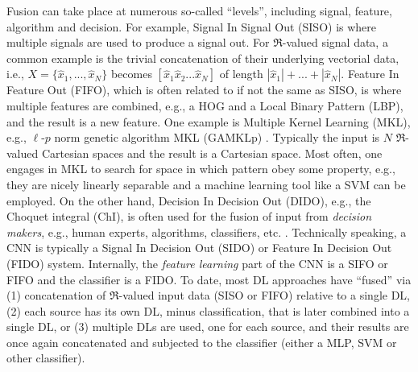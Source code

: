 \documentclass[12pt]{spieman}
\begin{document}
\begin{spacing}{1}
Fusion can take place at numerous so-called ``levels'', including signal, feature, algorithm and decision. For example, Signal In Signal Out (SISO) is where multiple signals are used to produce a signal out. For $\Re$-valued signal data, a common example is the trivial concatenation of their underlying vectorial data, i.e., $X=\{ \hat{x}_1, ... , \hat{x}_N \}$ becomes $[ \hat{x}_1 \hat{x}_2 ... \hat{x}_N ]$ of length $|\hat{x}_1|+...+|\hat{x}_N|$. Feature In Feature Out (FIFO), which is often related to if not the same as SISO, is where multiple features are combined, e.g., a HOG and a Local Binary Pattern (LBP), and the result is a new feature. One example is Multiple Kernel Learning (MKL), e.g., $\ell$-$p$ norm genetic algorithm MKL (GAMKLp) \cite{7762088} . Typically the input is $N$ $\Re$-valued Cartesian spaces and the result is a Cartesian space. Most often, one engages in MKL to search for space in which pattern obey some property, e.g., they are nicely linearly separable and a machine learning tool like a SVM can be employed. On the other hand, Decision In Decision Out (DIDO), e.g., the Choquet integral (ChI), is often used for the fusion of input from \emph{decision makers}, e.g., human experts, algorithms, classifiers, etc. \cite{6722924}. Technically speaking, a CNN is typically a Signal In Decision Out (SIDO) or Feature In Decision Out (FIDO) system. Internally, the \emph{feature learning} part of the CNN is a SIFO or FIFO and the classifier is a FIDO. To date, most DL approaches have ``fused'' via (1) concatenation of $\Re$-valued input data (SISO or FIFO) relative to a single DL, (2) each source has its own DL, minus classification, that is later combined into a single DL, or (3) multiple DLs are used, one for each source, and their results are once again concatenated and subjected to the classifier (either a MLP, SVM or other classifier).


\end{spacing}
\end{document}
